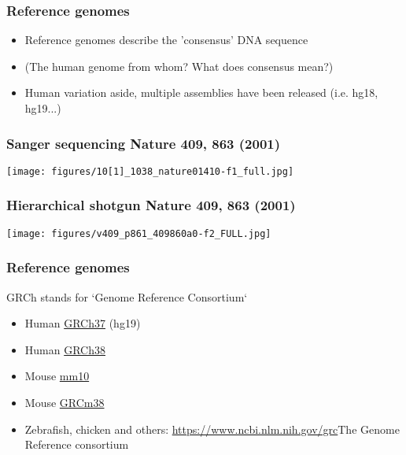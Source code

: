 \documentclass{beamer}
\begin{document}


\begin{frame}
  \frametitle{Reference genomes}
  \begin{itemize}
  \item Reference genomes describe the 'consensus' DNA sequence 
  \item (The human genome from whom? What does consensus mean?)
  \item Human variation aside, multiple assemblies have been released (i.e. hg18, hg19...)
  \end{itemize}
\end{frame}

\begin{frame}
  \frametitle{Sanger sequencing Nature 409, 863 (2001)}
\centering
\texttt{[image: figures/10[1]\_1038\_nature01410-f1\_full.jpg]}
\end{frame}

\begin{frame}
  \frametitle{Hierarchical shotgun Nature 409, 863 (2001)}
\centering
\texttt{[image: figures/v409\_p861\_409860a0-f2\_FULL.jpg]}
\end{frame}



\begin{frame}
  \frametitle{Reference genomes}
  GRCh stands for `Genome Reference Consortium`
  \begin{itemize}
  \item Human \href{https://www.ncbi.nlm.nih.gov/assembly/GCF_000001405.13/}{GRCh37} (hg19)
  \item Human \href{https://www.ncbi.nlm.nih.gov/assembly/GCF_000001405.38}{GRCh38}
  \item Mouse \href{https://www.ncbi.nlm.nih.gov/assembly/GCF_000001635.20/}{mm10}
  \item Mouse \href{https://www.ncbi.nlm.nih.gov/assembly/GCF_000001635.26}{GRCm38}

  \item Zebrafish, chicken and others: \url{https://www.ncbi.nlm.nih.gov/grc}{The Genome Reference consortium}

  \end{itemize}
\end{frame}
\end{document}
